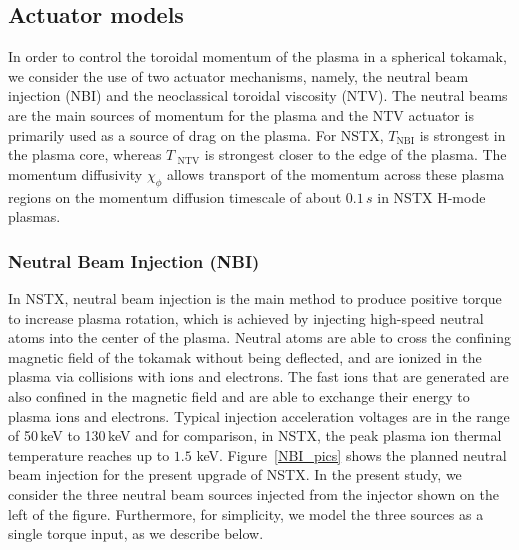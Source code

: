 \documentclass{iopart}
\begin{document}
\subsection{Actuator models}

In order to control the toroidal momentum of the plasma in a spherical tokamak, we consider the use of two actuator mechanisms, namely, the neutral beam injection (NBI) and the neoclassical toroidal viscosity (NTV). The neutral beams are the main sources of momentum for the plasma and the NTV actuator is primarily used as a source of drag on the plasma. For NSTX, $T_\text{NBI}$ is strongest  in the plasma core, whereas $T_\text{ NTV}$ is strongest closer to the edge of the plasma. The momentum diffusivity $\chi_\phi$ allows transport of the momentum across these plasma regions on the momentum diffusion timescale of about $0.1\,s$ in NSTX H-mode plasmas.


\subsubsection{Neutral Beam Injection (NBI)}
 \label{NBIAM}

In NSTX, neutral beam injection is the main method to produce positive torque to increase plasma rotation, which is achieved  by injecting high-speed neutral atoms into the center of the plasma. 
Neutral atoms are able to cross the confining magnetic field of the tokamak without being deflected, and are ionized in the plasma via collisions with ions and electrons. The fast ions that are generated are also confined in the magnetic field and are able to exchange their energy to plasma ions and electrons. Typical injection acceleration voltages are in the range of 50\,keV to 130\,keV and for comparison, in NSTX, the peak plasma ion thermal temperature reaches up to $1.5$ keV.
Figure~{\ref{NBI_pics}} shows the planned neutral beam injection for the present
upgrade of NSTX. In the present study, we consider the three neutral beam
sources injected from the injector shown on the left of the figure.
Furthermore, for simplicity, we model the three sources as a single torque
input, as we describe below.
\end{document}
